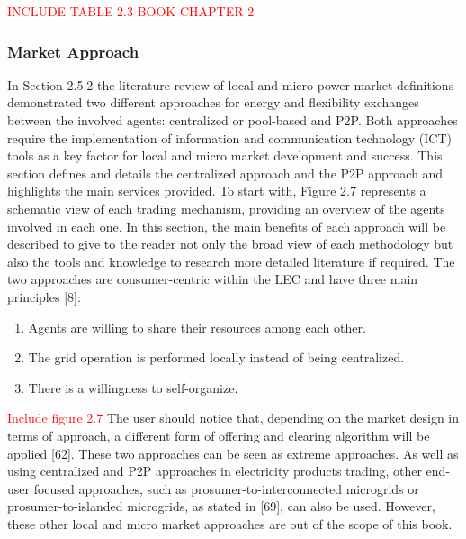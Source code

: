 \textcolor{red}{INCLUDE TABLE 2.3 BOOK CHAPTER 2}

\subsubsection{Market Approach}

In Section 2.5.2 the literature review of local and micro power market definitions demonstrated two different
approaches for energy and flexibility exchanges between the involved agents: centralized or pool-based and
P2P. Both approaches require the implementation of information and communication technology (ICT) tools
as a key factor for local and micro market development and success. This section defines and details the
centralized approach and the P2P approach and highlights the main services provided. To start with, Figure 2.7
represents a schematic view of each trading mechanism, providing an overview of the agents involved in
each one. In this section, the main benefits of each approach will be described to give to the reader not only
the broad view of each methodology but also the tools and knowledge to research more detailed literature if
required. The two approaches are consumer-centric within the LEC and have three main principles [8]:

\begin{enumerate}
\item Agents are willing to share their resources among each other.
\item The grid operation is performed locally instead of being centralized.
\item There is a willingness to self-organize.
\end{enumerate}


\textcolor{red}{Include figure 2.7}
The user should notice that, depending on the market design in terms of approach, a different form of offering and clearing algorithm will be applied [62]. These two approaches can be seen as extreme approaches. As well as using centralized and P2P approaches in electricity products trading, other end-user focused approaches, such as prosumer-to-interconnected microgrids or prosumer-to-islanded microgrids, as stated in [69], can also be used. However, these other local and micro market approaches are out of the scope of this book.

